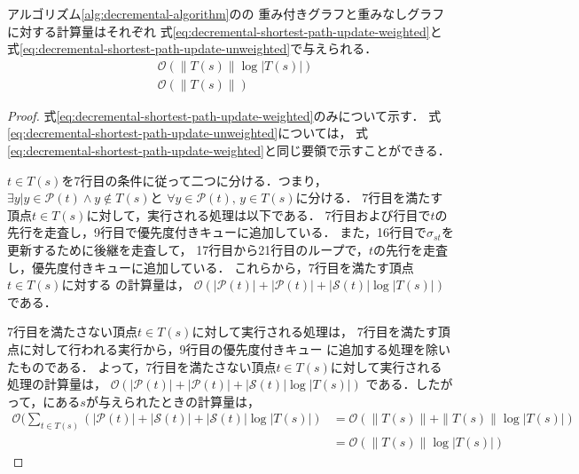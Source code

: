 \begin{theorem}
  \label{thm:decremental-shortest-path-update}
  アルゴリズム\ref{alg:decremental-algorithm}のの
  重み付きグラフと重みなしグラフに対する計算量はそれぞれ
  式\eqref{eq:decremental-shortest-path-update-weighted}と
  式\eqref{eq:decremental-shortest-path-update-unweighted}で与えられる．
  \begin{align}
    &\mathcal{O}\left(\|T(s)\|\log|T(s)|\right)
    \label{eq:decremental-shortest-path-update-weighted} \\
    &\mathcal{O}\left(\|T(s)\|\right)
    \label{eq:decremental-shortest-path-update-unweighted}
  \end{align}
\end{theorem}
\begin{proof}
  式\eqref{eq:decremental-shortest-path-update-weighted}のみについて示す．
  式\eqref{eq:decremental-shortest-path-update-unweighted}については，
  式\eqref{eq:decremental-shortest-path-update-weighted}と同じ要領で示すことができる．

  $t\in T(s)$を7行目の条件に従って二つに分ける．つまり，
  $\exists y|y\in\mathcal{P}(t)\land y\notin T(s)$と
  $\forall y\in\mathcal{P}(t),\,y\in T(s)$に分ける．
  7行目を満たす頂点$t\in T(s)$に対して，実行される処理は以下である．
  7行目および行目で$t$の先行を走査し，9行目で優先度付きキューに追加している．
  また，16行目で$\sigma_{st}$を更新するために後継を走査して，
  17行目から21行目のループで，$t$の先行を走査し，優先度付きキューに追加している．
  これらから，7行目を満たす頂点$t\in T(s)$に対する
  の計算量は，
  $\mathcal{O}(|\mathcal{P}(t)|+|\mathcal{P}(t)|+|\mathcal{S}(t)|\log|T(s)|)$
  である．

  7行目を満たさない頂点$t\in T(s)$に対して実行される処理は，
  7行目を満たす頂点に対して行われる実行から，9行目の優先度付きキュー
  に追加する処理を除いたものである．
  よって，7行目を満たさない頂点$t\in T(s)$に対して実行される処理の計算量は，
  $\mathcal{O}(|\mathcal{P}(t)|+|\mathcal{P}(t)|+|\mathcal{S}(t)|\log|T(s)|)$
  である．したがって，にある$s$が与えられたときの計算量は，
  \begin{equation*}
    \begin{aligned}
      \mathcal{O}(\sum_{t\in T(s)}(|\mathcal{P}(t)|+|\mathcal{S}(t)|+|\mathcal{S}(t)|\log|T(s)|)
      &=\mathcal{O}(\|T(s)\|+\|T(s)\|\log|T(s)|) \\
      &=\mathcal{O}(\|T(s)\|\log|T(s)|)
    \end{aligned}
  \end{equation*}
\end{proof}

